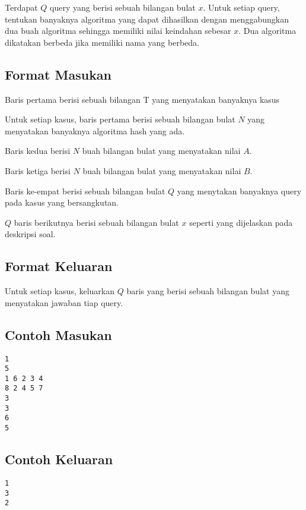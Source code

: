 \documentclass{article}
\begin{document}
\par Terdapat $Q$ query yang berisi sebuah bilangan bulat $x$. Untuk setiap query, tentukan banyaknya algoritma yang dapat dihasilkan dengan menggabungkan dua buah algoritma sehingga memiliki nilai keindahan sebesar $x$. Dua algoritma dikatakan berbeda jika memiliki nama yang berbeda.

\subsection*{Format Masukan}
\par Baris pertama berisi sebuah bilangan T yang menyatakan banyaknya kasus
\par Untuk setiap kasus, baris pertama berisi sebuah bilangan bulat $N$ yang menyatakan banyaknya algoritma hash yang ada.
\par Baris kedua berisi $N$ buah bilangan bulat yang menyatakan nilai $A$.
\par Baris ketiga berisi $N$ buah bilangan bulat yang menyatakan nilai $B$.
\par Baris ke-empat berisi sebuah bilangan bulat $Q$ yang menytakan banyaknya query pada kasus yang bersangkutan.
\par $Q$ baris berikutnya berisi sebuah bilangan bulat $x$ seperti yang dijelaskan pada deskripsi soal.

\subsection*{Format Keluaran}

\par Untuk setiap kasus, keluarkan $Q$ baris yang berisi sebuah bilangan bulat yang menyatakan jawaban tiap query.

\subsection*{Contoh Masukan}

\begin{lstlisting}
1
5
1 6 2 3 4
8 2 4 5 7
3
3
6
5
\end{lstlisting}

\subsection*{Contoh Keluaran}

\begin{lstlisting}
1
3
2
\end{lstlisting}
\end{document}
